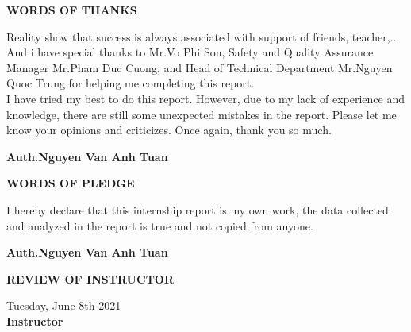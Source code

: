 \documentclass[a4paper,13pt]{report}
\begin{document}
    \newpage
    \thispagestyle{plain}
    \centering
    \justifying
    \centerline{\textbf{\huge{WORDS OF THANKS}}}
    \vspace{10mm}
    \begin{flushleft}
        Reality show that success is always associated with support of friends, teacher,... And i have special thanks to Mr.Vo Phi Son, Safety and Quality 
        Assurance Manager Mr.Pham Duc Cuong, and Head of Technical Department Mr.Nguyen Quoc Trung for helping me completing this report. \\ 
        \vspace{2mm}
        I have tried my best to do this report. However, due to my lack of experience and knowledge, there are still some unexpected mistakes in the report. 
        Please let me know your opinions and criticizes. Once again, thank you so much. 
    \end{flushleft}
    \begin{flushright}
        \textbf{Auth.Nguyen Van Anh Tuan}
    \end{flushright}

    \newpage
    \thispagestyle{plain}
    \centering
    \justifying
    \centerline{\textbf{\huge{WORDS OF PLEDGE}}}
    \vspace{10mm}
    \begin{flushleft}
        I hereby declare that this internship report is my own work, the data collected and analyzed in the report is true and not copied from anyone.
    \end{flushleft}
    \begin{flushright}
        \textbf{Auth.Nguyen Van Anh Tuan}
    \end{flushright}
    
    \newpage
    \centerline{\huge{\textbf{REVIEW OF INSTRUCTOR}}}
    \vspace{10mm}
    \noindent\makebox[\linewidth]{\rule{\paperwidth}{0.4pt}}
    \noindent\makebox[\linewidth]{\rule{\paperwidth}{0.4pt}}
    \noindent\makebox[\linewidth]{\rule{\paperwidth}{0.4pt}}
    \noindent\makebox[\linewidth]{\rule{\paperwidth}{0.4pt}}
    \noindent\makebox[\linewidth]{\rule{\paperwidth}{0.4pt}}
    \noindent\makebox[\linewidth]{\rule{\paperwidth}{0.4pt}}
    \noindent\makebox[\linewidth]{\rule{\paperwidth}{0.4pt}}
    \noindent\makebox[\linewidth]{\rule{\paperwidth}{0.4pt}}
    \noindent\makebox[\linewidth]{\rule{\paperwidth}{0.4pt}}
    \noindent\makebox[\linewidth]{\rule{\paperwidth}{0.4pt}}
    \noindent\makebox[\linewidth]{\rule{\paperwidth}{0.4pt}}
    \noindent\makebox[\linewidth]{\rule{\paperwidth}{0.4pt}}
    \noindent\makebox[\linewidth]{\rule{\paperwidth}{0.4pt}}
    \noindent\makebox[\linewidth]{\rule{\paperwidth}{0.4pt}}
    \noindent\makebox[\linewidth]{\rule{\paperwidth}{0.4pt}}
    \vspace{10mm}
    \begin{flushright}
        Tuesday, June 8th 2021 \\ 
        \vspace{5mm}
        \textbf{Instructor}
    \end{flushright}
\end{document}
